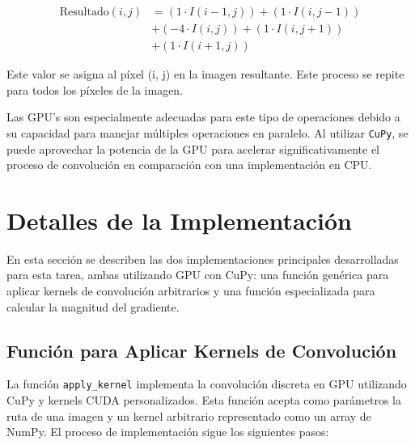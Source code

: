 \documentclass{pas}
\begin{document}
\begin{align*}
\text{Resultado}(i, j) &= (1 \cdot I(i-1, j)) + (1 \cdot I(i, j-1)) \\
 &+ (-4 \cdot I(i, j)) + (1 \cdot I(i, j+1)) \\
 &+ (1 \cdot I(i+1, j)) 
\end{align*}

Este valor se asigna al píxel (i, j) en la imagen resultante. Este proceso se repite para todos los píxeles de la imagen.

Las GPU's son especialmente adecuadas para este tipo de operaciones debido a su capacidad para manejar múltiples operaciones en paralelo. Al utilizar \texttt{CuPy}, se puede aprovechar la potencia de la GPU para acelerar significativamente el proceso de convolución en comparación con una implementación en CPU.

\section{Detalles de la Implementación}

En esta sección se describen las dos implementaciones principales desarrolladas para esta tarea, ambas utilizando GPU con CuPy: una función genérica para aplicar kernels de convolución arbitrarios y una función especializada para calcular la magnitud del gradiente.

\subsection{Función para Aplicar Kernels de Convolución}

La función \texttt{apply\_kernel} implementa la convolución discreta en GPU utilizando CuPy y kernels CUDA personalizados. Esta función acepta como parámetros la ruta de una imagen y un kernel arbitrario representado como un array de NumPy. El proceso de implementación sigue los siguientes pasos:
\end{document}
